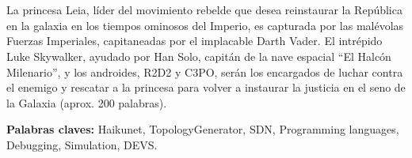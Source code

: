 \chapter*{\runtitulo}

\noindent La princesa Leia, líder del movimiento rebelde que desea reinstaurar la República en la galaxia en los tiempos ominosos del Imperio, es capturada por las malévolas Fuerzas Imperiales, capitaneadas por el implacable Darth Vader. El intrépido Luke Skywalker, ayudado por Han Solo, capitán de la nave espacial ``El Halcón Milenario'', y los androides, R2D2 y C3PO, serán los encargados de luchar contra el enemigo y rescatar a la princesa para volver a instaurar la justicia en el seno de la Galaxia (aprox. 200 palabras).

\bigskip

\noindent\textbf{Palabras claves:} Haikunet, TopologyGenerator, SDN, Programming languages, Debugging, Simulation, DEVS.
